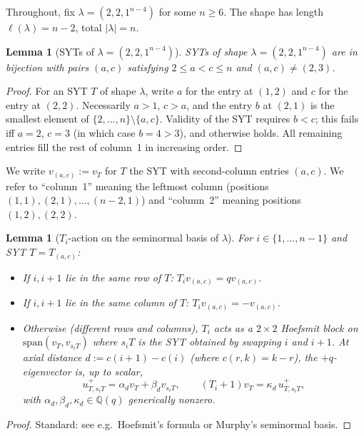 \documentclass[11pt]{article}
\newtheorem{lemma}[theorem]{Lemma}
\theoremstyle{definition}
\begin{document}
Throughout, fix $\lambda = (2,2,1^{n-4})$ for some $n \ge 6$.  The
shape has length $\ell(\lambda) = n-2$, total $|\lambda| = n$.

\begin{lemma}[SYTs of $\lambda=(2,2,1^{n-4})$]\label{lem:syts-22}
SYTs of shape $\lambda = (2,2,1^{n-4})$ are in bijection with pairs
$(a,c)$ satisfying $2 \le a < c \le n$ and $(a,c) \ne (2,3)$.
\end{lemma}

\begin{proof}
For an SYT $T$ of shape $\lambda$, write $a$ for the entry at $(1,2)$
and $c$ for the entry at $(2,2)$.  Necessarily $a > 1$, $c > a$, and
the entry $b$ at $(2,1)$ is the smallest element of
$\{2,\ldots,n\}\setminus\{a,c\}$.  Validity of the SYT requires
$b < c$; this fails iff $a = 2,\, c = 3$ (in which case $b = 4 > 3$),
and otherwise holds.  All remaining entries fill the rest of column~1
in increasing order.
\end{proof}

We write $v_{(a,c)} := v_T$ for $T$ the SYT with second-column
entries $(a,c)$.  We refer to ``column~1'' meaning the leftmost column
(positions $(1,1),(2,1),\ldots,(n-2,1)$) and ``column~2'' meaning
positions $(1,2),(2,2)$.

\begin{lemma}[$T_i$-action on the seminormal basis of $\lambda$]\label{lem:Ti-action}
For $i \in \{1,\ldots,n-1\}$ and SYT $T = T_{(a,c)}$:
\begin{itemize}[leftmargin=2em,topsep=0.3em,itemsep=0.2em]
\item If $i,i{+}1$ lie in the same row of $T$: $T_iv_{(a,c)} = qv_{(a,c)}$.
\item If $i,i{+}1$ lie in the same column of $T$: $T_iv_{(a,c)} = -v_{(a,c)}$.
\item Otherwise (different rows and columns), $T_i$ acts as a
$2\times 2$ Hoefsmit block on $\mathrm{span}(v_T, v_{s_iT})$ where
$s_i T$ is the SYT obtained by swapping $i$ and $i{+}1$.  At axial
distance $d := c(i{+}1) - c(i)$ (where $c(r,k) = k - r$), the
$+q$-eigenvector is, up to scalar,
\[
   u^+_{T,s_iT} = \alpha_d v_T + \beta_d v_{s_iT},
   \qquad
   (T_i{+}1)v_T = \kappa_d\, u^+_{T,s_iT},
\]
with $\alpha_d, \beta_d, \kappa_d \in \mathbb{Q}(q)$ generically nonzero.
\end{itemize}
\end{lemma}

\begin{proof}
Standard: see e.g.\ Hoefsmit's formula or Murphy's seminormal basis.
\end{proof}
\end{document}
